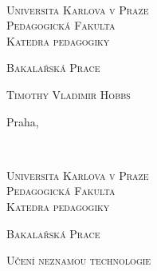 \documentclass[a4paper,12pt,czech,cleardoublepage=empty]{scrreprt}
\newcommand{\SubjectCs}{Bakalařská Prace}
\newcommand{\TitleCs}{Učení neznamou technologie}
\newcommand{\AuthorName}{Timothy Vladimir Hobbs}
\newcommand{\IssuedIn}{Praha}
\newcommand{\DepartmentCs}{Katedra pedagogiky}
\newcommand{\noun}[1]{\textsc{#1}}
\begin{document}
~\thispagestyle{empty}\vfill{}

\begin{center}
\vspace{10mm}
\textsf{\textsc{\noun{\LARGE Universita Karlova v Praze}}}\\
\vspace{0.5em}
\textsf{\textsc{\noun{\LARGE Pedagogická Fakulta}}}\\
\vspace*{1em}
\textsf{\textsc{\noun{\Large \DepartmentCs}}}\vspace{15mm}
\vspace{30mm}

\textsf{\textsc{\noun{\huge \SubjectCs}}}{\huge \par}

\vspace{15mm}


\vspace{10mm}

\textsf{\textsc{\noun{\Large \AuthorName}}}

\end{center}

\vspace*{\fill}


\vspace{10mm}

\textsf{\large \IssuedIn, \the\year}


\clearpage{}~\thispagestyle{empty}\begin{center}\vspace{10mm}


\textsf{\textsc{\noun{\LARGE Universita Karlova v Praze}}}\\
\vspace{0.5em}
\textsf{\textsc{\noun{\LARGE Pedagogická Fakulta}}}\\
\vspace*{1em}
\textsf{\textsc{\noun{\Large \DepartmentCs}}}\vspace{15mm}


\vspace{15mm}

\textsf{\textsc{\noun{\huge \SubjectCs}}}{\huge \par}

\vspace{15mm}


\textsf{\textsc{\noun{\LARGE \TitleCs}}}{\LARGE \par}


\vspace{10mm}


\end{center} 
\end{document}
